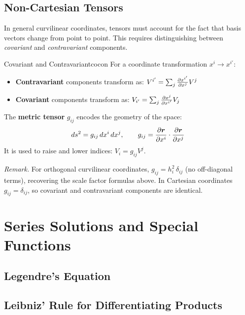 \documentclass[11pt, letterpaper]{article}
\theoremstyle{plain}
\newenvironment{remark}{\smallskip\noindent\textit{Remark.}}{\smallskip}
\newcommand{\vv}[1]{\bm{#1}}
\begin{document}
\subsection{Non-Cartesian Tensors}

In general curvilinear coordinates, tensors must account for the fact that
basis vectors change from point to point. This requires distinguishing
between \emph{covariant} and \emph{contravariant} components.

\begin{definition}{Covariant and Contravariant}{cocon}
    For a coordinate transformation $x^i \to x^{i'}$:
    \begin{itemize}
        \item \textbf{Contravariant} components transform as:
              $V^{i'} = \sum_j \pdv{x^{i'}}{x^j} V^j$
        \item \textbf{Covariant} components transform as:
              $V_{i'} = \sum_j \pdv{x^j}{x^{i'}} V_j$
    \end{itemize}
\end{definition}

The \textbf{metric tensor} $g_{ij}$ encodes the geometry of the space:
\[
    ds^2 = g_{ij}\,dx^i\,dx^j, \qquad
    g_{ij} = \pdv{\vv{r}}{x^i}\cdot\pdv{\vv{r}}{x^j}
\]
It is used to raise and lower indices: $V_i = g_{ij}V^j$.

\begin{remark}
    For orthogonal curvilinear coordinates, $g_{ij} = h_i^2\,\delta_{ij}$
    (no off-diagonal terms), recovering the scale factor formulas above.
    In Cartesian coordinates $g_{ij} = \delta_{ij}$, so covariant and
    contravariant components are identical.
\end{remark}




\newpage
\section{Series Solutions and Special Functions} %

\subsection{Legendre's Equation}

\subsection{Leibniz' Rule for Differentiating Products}
\end{document}
